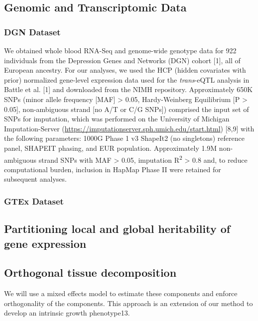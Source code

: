 \documentclass[]{article}
\begin{document}
\subsection{Genomic and Transcriptomic
Data}\label{genomic-and-transcriptomic-data}

\subsubsection{DGN Dataset}\label{dgn-dataset}

We obtained whole blood RNA-Seq and genome-wide genotype data for 922
individuals from the Depression Genes and Networks (DGN) cohort {[}1{]},
all of European ancestry. For our analyses, we used the HCP (hidden
covariates with prior) normalized gene-level expression data used for
the \emph{trans}-eQTL analysis in Battle et al. {[}1{]} and downloaded
from the NIMH repository. Approximately 650K SNPs (minor allele
frequency {[}MAF{]} \textgreater{} 0.05, Hardy-Weinberg Equilibrium {[}P
\textgreater{} 0.05{]}, non-ambiguous strand {[}no A/T or C/G SNPs{]})
comprised the input set of SNPs for imputation, which was performed on
the University of Michigan Imputation-Server
(\url{https://imputationserver.sph.umich.edu/start.html}) {[}8,9{]} with
the following parameters: 1000G Phase 1 v3 ShapeIt2 (no singletons)
reference panel, SHAPEIT phasing, and EUR population. Approximately 1.9M
non-ambiguous strand SNPs with MAF \textgreater{} 0.05, imputation
R\textsuperscript{2} \textgreater{} 0.8 and, to reduce computational
burden, inclusion in HapMap Phase II were retained for subsequent
analyses.

\subsubsection{GTEx Dataset}\label{gtex-dataset}

\subsection{Partitioning local and global heritability of gene
expression}\label{partitioning-local-and-global-heritability-of-gene-expression}

\subsection{Orthogonal tissue
decomposition}\label{orthogonal-tissue-decomposition}

We will use a mixed effects model to estimate these components and
enforce orthogonality of the components. This approach is an extension
of our method to develop an intrinsic growth phenotype13.
\end{document}
